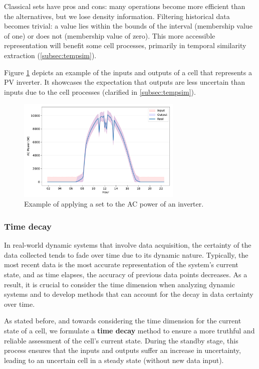 Classical sets have pros and cons: many operations become more efficient than the alternatives, but we lose density information. Filtering historical data becomes trivial: a value lies within the bounds of the interval (membership value of one) or does not (membership value of zero). This more accessible representation will benefit some cell processes, primarily in temporal similarity extraction (\ref{subsec:tempsim}).

Figure \ref{fig:exampleset} depicts an example of the inputs and outputs of a cell that represents a PV inverter. It showcases the expectation that outputs are less uncertain than inputs due to the cell processes (clarified in \ref{subsec:tempsim}).

\begin{figure}[h!]
    \centering
    \includegraphics[width=0.7\textwidth]{figures/chapter4/cell/example_fuzzy.pdf}
    \caption{Example of applying a set to the AC power of an inverter.}
    \label{fig:exampleset}
\end{figure}


\subsubsection{Time decay} \label{subsec:timedecay}

In real-world dynamic systems that involve data acquisition, the certainty of the data collected tends to fade over time due to its dynamic nature. Typically, the most recent data is the most accurate representation of the system's current state, and as time elapses, the accuracy of previous data points decreases. As a result, it is crucial to consider the time dimension when analyzing dynamic systems and to develop methods that can account for the decay in data certainty over time.

As stated before, and towards considering the time dimension for the current state of a cell, we formulate a \textbf{time decay} method to ensure a more truthful and reliable assessment of the cell's current state. During the standby stage, this process ensures that the inputs and outputs suffer an increase in uncertainty, leading to an uncertain cell in a steady state (without new data input).

